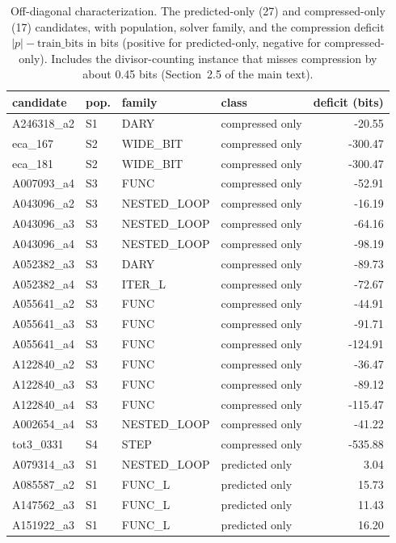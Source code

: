 \begin{table}[!ht]\centering
\caption{Off-diagonal characterization. The predicted-only (27) and compressed-only (17) candidates, with population, solver family, and the compression deficit $|p|-\text{train\_bits}$ in bits (positive for predicted-only, negative for compressed-only). Includes the divisor-counting instance that misses compression by about 0.45 bits (Section~2.5 of the main text).}\label{tab:sc5}
\begin{tabular}{llllr}\toprule
candidate & pop. & family & class & deficit (bits) \\\midrule
A246318\_a2 & S1 & DARY & compressed only & -20.55 \\
eca\_167 & S2 & WIDE\_BIT & compressed only & -300.47 \\
eca\_181 & S2 & WIDE\_BIT & compressed only & -300.47 \\
A007093\_a4 & S3 & FUNC & compressed only & -52.91 \\
A043096\_a2 & S3 & NESTED\_LOOP & compressed only & -16.19 \\
A043096\_a3 & S3 & NESTED\_LOOP & compressed only & -64.16 \\
A043096\_a4 & S3 & NESTED\_LOOP & compressed only & -98.19 \\
A052382\_a3 & S3 & DARY & compressed only & -89.73 \\
A052382\_a4 & S3 & ITER\_L & compressed only & -72.67 \\
A055641\_a2 & S3 & FUNC & compressed only & -44.91 \\
A055641\_a3 & S3 & FUNC & compressed only & -91.71 \\
A055641\_a4 & S3 & FUNC & compressed only & -124.91 \\
A122840\_a2 & S3 & FUNC & compressed only & -36.47 \\
A122840\_a3 & S3 & FUNC & compressed only & -89.12 \\
A122840\_a4 & S3 & FUNC & compressed only & -115.47 \\
A002654\_a4 & S3 & NESTED\_LOOP & compressed only & -41.22 \\
tot3\_0331 & S4 & STEP & compressed only & -535.88 \\
A079314\_a3 & S1 & NESTED\_LOOP & predicted only & 3.04 \\
A085587\_a2 & S1 & FUNC\_L & predicted only & 15.73 \\
A147562\_a3 & S1 & FUNC\_L & predicted only & 11.43 \\
A151922\_a3 & S1 & FUNC\_L & predicted only & 16.20 \\

\end{tabular}
\end{table}
